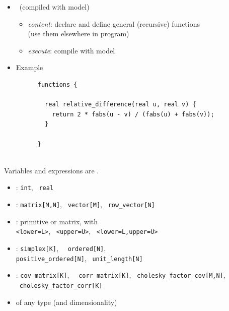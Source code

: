 \documentclass[10pt]{report}
\newcommand{\sld}[1]{\newpage{\noindent\LARGE \ \ \
    \textcolor{MidnightBlue}{\bfseries #1}}\vspace*{4pt}}
\newcommand{\myemph}[1]{{\color{MidnightBlue}{\bfseries #1}}}
\begin{document}
\begin{itemize}
\item \myemph{\tt\bfseries functions} \ (compiled with model)
  \vspace*{-4pt}
  \begin{itemize}\small
  \item {\slshape content}: declare and define general (recursive) functions
    \\
    {\small (use them elsewhere in program)}
  \item {\slshape execute}: compile with model
  \end{itemize}
  \vspace*{6pt}
\item Example
  \\[6pt]
  \begin{minipage}[t]{0.8\textwidth}
    \footnotesize
    \begin{Verbatim}
      functions {

        real relative_difference(real u, real v) {
          return 2 * fabs(u - v) / (fabs(u) + fabs(v));
        }

      }
    \end{Verbatim}
  \end{minipage}
\end{itemize}

\sld{Variable and Expression Types}
\\[3pt]
\hspace*{17pt}Variables and expressions are \myemph{strongly, statically typed}.
\begin{itemize}
\item \myemph{Primitive}: {\tt\small int}, \ {\tt\small real}
\item \myemph{Matrix}: {\tt\small matrix[M,N]}, \ {\tt\small vector[M]}, \ {\tt\small row\_vector[N]}
\item \myemph{Bounded}: primitive or matrix, with 
  \\ {\tt\small <lower=L>}, \ {\tt\small <upper=U>}, \ {\tt\small <lower=L,upper=U>}
\item \myemph{Constrained Vectors}: {\tt\small simplex[K]}, \ {\tt\small
    ordered[N]},
  \\ {\tt\small positive\_ordered[N]}, \ {\tt\small unit\_length[N]}
\item \myemph{Constrained Matrices}: {\tt\small cov\_matrix[K]}, \ {\tt\small
    corr\_matrix[K]}, \ {\tt\small cholesky\_factor\_cov[M,N]}, \
  {\tt\small cholesky\_factor\_corr[K]}
\item \myemph{Arrays:}  of any type (and dimensionality)
\end{itemize}
\end{document}
